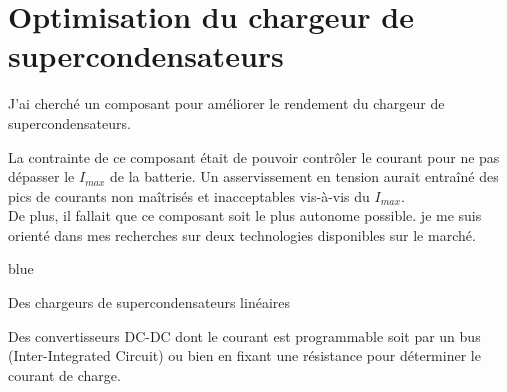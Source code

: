 









\newpage
\section{Optimisation du chargeur de supercondensateurs}

J'ai cherché un composant pour améliorer le rendement du chargeur de supercondensateurs. 

La contrainte de ce composant était de pouvoir contrôler le courant pour ne pas dépasser le $I_{max}$ de la batterie.
Un asservissement en tension aurait entraîné des pics de courants non maîtrisés et inacceptables vis-à-vis du $I_{max}$.\\
De plus, il fallait que ce composant soit le plus autonome possible.
je me suis orienté dans mes recherches sur deux technologies disponibles sur le marché.

\begin{items}{blue}{\Circle}
    \item Des chargeurs de supercondensateurs linéaires
    \item Des convertisseurs DC-DC dont le courant est programmable soit par un bus  (Inter-Integrated Circuit) ou bien en fixant une résistance pour déterminer le courant de charge.
\end{items}

